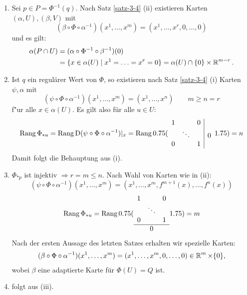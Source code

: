 \begin{bew}\begin{enumerate}[label=(\roman*),widest=iii,leftmargin=*]
\item
	Sei $p \in P = \Phi^{-1}(q)$. Nach Satz \ref{satz-3-4} (ii) existieren Karten $(\alpha,U), (\beta, V)$ mit 
		\[ (\beta \circ \Phi \circ \alpha^{-1})(x^1,\ldots,x^m) = (x^1, \ldots,x^r, 0, \ldots, 0) \]
	und es gilt:
	\begin{align*}
		\alpha(P \cap U) & = (\alpha \circ \Phi^{-1} \circ \beta^{-1})(0) \\
		& = \{x \in \alpha (U) \mid x^1 = \ldots = x^r = 0\} = \alpha(U) \cap \{0\} \times \operatorname{\mathbb{R}}^{m-r}.
	\end{align*} 
\item
	Ist $q$ ein regulärer Wert von $\Phi$, so existieren nach Satz \ref{satz-3-4} (i) Karten $\psi, \alpha$ mit 
		\[ (\psi \circ \Phi \circ \alpha^{-1})(x^1, \ldots, x^m) = (x^1, \ldots, x^n) \qquad m \geq n = r \]
	f"ur alle $x \in \alpha(U)$. Es gilt also für alle $u \in U$:
	\begin{align*}
		\operatorname{Rang} \Phi_{*u} = \operatorname{Rang} \operatorname{D}(\psi \circ \Phi \circ \alpha^{-1})|_x = \operatorname{Rang}
		0.75(\begin{array}{ccc|c}
			1 &  & 0 & \\
			& \ddots & & 0 \\
			0 & & 1 & 
		\end{array}1.75)
		= n
	\end{align*}
	Damit folgt die Behauptung aus (i).
\item
	$\Phi_{*p}$ ist injektiv $\Rightarrow r = m \leq n$. Nach Wahl von Karten wie in (ii):
		\[ (\psi \circ \Phi \circ \alpha^{-1})(x^1, \ldots, x^m) = (x^1, \ldots, x^m,f^{m+1}(x), \ldots, f^n(x)) \]
		\[\operatorname{Rang} \Phi_{*u} = \operatorname{Rang} 
			0.75( \begin{array}{ccc}
				1 & & 0 \\
				& \ddots &  \\
				0 & & 1 \\
				\hline
				& 0      & 
			\end{array} 1.75)
		= m \]
	Nach der ersten Aussage des letzten Satzes erhalten wir spezielle Karten:
	\begin{align*}
		(\beta \circ \Phi \circ \alpha^{-1})(x^1, \ldots, x^m) = (x^1, \ldots, x^m, 0, \ldots, 0) \in \operatorname{\mathbb{R}}^{m} \times \{0\},
	\end{align*}
	wobei $\beta$ eine adaptierte Karte für $\Phi(U) = Q$ ist.
\item
	folgt aus (iii).
\end{enumerate}\end{bew}


